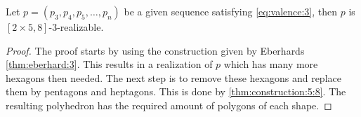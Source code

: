 \begin{corollary}
  Let $p = (p_3, p_4, p_5, \dots, p_n)$ be a given sequence satisfying \autoref{eq:valence:3}, then $p$ is $[2 \times 5, 8]$-$3$-realizable.
  \begin{proof}
    The proof starts by using the construction given by Eberhards \autoref{thm:eberhard:3}. This results in a realization of $p$ which has many more hexagons then needed. The next step is to remove these hexagons and replace them by pentagons and heptagons. This is done by \autoref{thm:construction:5:8}. The resulting polyhedron has the required amount of polygons of each shape.
  \end{proof}
\end{corollary}

